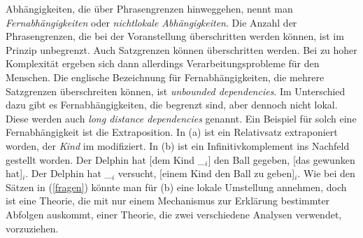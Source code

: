 Abhängigkeiten, die über Phrasengrenzen hinweggehen, nennt man
\emph{Fernabhängigkeiten} oder \emph{nichtlokale Abhängigkeiten}. Die Anzahl der Phrasengrenzen, die bei der Voranstellung überschritten werden können, ist im Prinzip
unbegrenzt. Auch Satzgrenzen können überschritten werden. Bei zu hoher Komplexität ergeben sich
dann allerdings Verarbeitungsprobleme für den Menschen. 
Die englische Bezeichnung für Fernabhängigkeiten, die mehrere Satzgrenzen überschreiten können,
ist \emph{unbounded dependencies}. Im Unterschied dazu gibt es Fernabhängigkeiten, die
begrenzt sind, aber dennoch nicht lokal. Diese werden auch \emph{long distance dependencies}
genannt. Ein Beispiel für solch eine Fernabhängigkeit ist die Extraposition.
In (a) ist ein Relativsatz extraponiert worden, der \emph{Kind} im \mf modifiziert.
In (b) ist ein Infinitivkomplement ins Nachfeld gestellt worden. 
\eal
\label{bsp-extrap}
\ex Der Delphin hat [dem Kind \_$_i$] den Ball gegeben, [das gewunken hat]$_i$.
\ex Der Delphin hat \_$_i$ versucht, [einem Kind den Ball zu geben]$_i$.
\zl
Wie bei den Sätzen
in (\ref{fragen}) könnte man für (b) eine lokale Umstellung annehmen, doch ist eine
Theorie, die mit nur einem Mechanismus zur Erklärung bestimmter Abfolgen auskommt, einer
Theorie, die zwei verschiedene Analysen verwendet, vorzuziehen.

